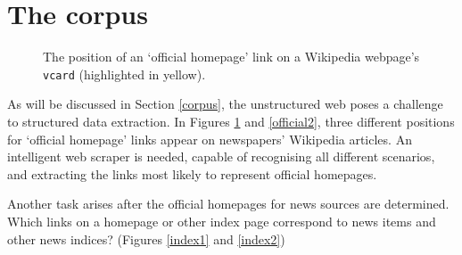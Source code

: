 \section{The corpus}
\begin{figure}
    \centering
    \caption{
        The position of an `official homepage' link on a Wikipedia
        webpage's {\tt vcard} (highlighted in yellow).
        \label{official1}
    }
\end{figure}
As will be discussed in Section \ref{corpus}, the unstructured web
poses a challenge to structured data extraction. In Figures
\ref{official1} and \ref{official2}, three different
positions for `official homepage' links appear on
newspapers' Wikipedia articles.  An intelligent web scraper is
needed, capable of recognising all different scenarios, and extracting
the links most likely to represent official homepages.

Another task arises after the official homepages for news sources
are determined.  Which links on a homepage or other
index page correspond to news items and other news indices?
(Figures \ref{index1} and \ref{index2})

